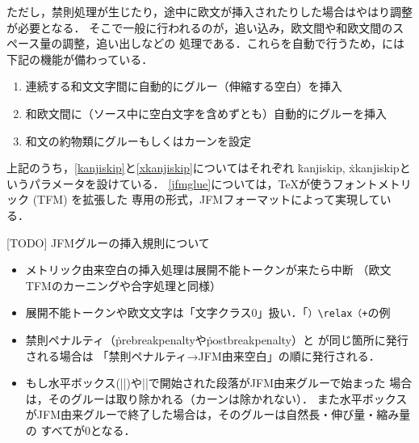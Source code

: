 \documentclass[a4paper,11pt,nomag,dvipdfmx]{jsarticle}
\begin{document}
ただし，禁則処理が生じたり，途中に欧文が挿入されたりした場合はやはり調整が必要となる．
そこで一般に行われるのが，追い込み，欧文間や和欧文間のスペース量の調整，追い出しなどの
処理である．これらを自動で行うため，\pTeX には下記の機能が備わっている．
\begin{enumerate}
\item 連続する和文文字間に自動的にグルー（伸縮する空白）を挿入\label{kanjiskip}
\item 和欧文間に（ソース中に空白文字を含めずとも）自動的にグルーを挿入\label{xkanjiskip}
\item 和文の約物類にグルーもしくはカーンを設定\label{jfmglue}
\end{enumerate}
上記のうち，\ref{kanjiskip}と\ref{xkanjiskip}についてはそれぞれ
\.{kanjiskip}, \.{xkanjiskip}というパラメータを設けている．
\ref{jfmglue}については，\TeX が使うフォントメトリック (TFM) を拡張した
\pTeX 専用の形式，JFMフォーマットによって実現している．

[TODO] JFMグルーの挿入規則について
\begin{itemize}
 \item メトリック由来空白の挿入処理は展開不能トークンが来たら中断
  （欧文TFMのカーニングや合字処理と同様）
 \item 展開不能トークンや欧文文字は「文字クラス0」扱い．「\verb|）\relax（+|の例
 \item 禁則ペナルティ（\.{prebreakpenalty}や\.{postbreakpenalty}）と
  が同じ箇所に発行される場合は
  「禁則ペナルティ→JFM由来空白」の順に発行される．
\iffalse %
 \item より一般に，禁則ペナルティ，JFM由来空白，ベースライン補正，
  欧文TFM由来カーンが同じ箇所に発行される場合は
  次の順になる（\ref{sec:kinsoku}節の注意の一般化）．%
  \begin{itemize}
   \item 和文→欧文：禁則ペナルティ→JFM由来空白→ベースライン補正→%
   欧文TFM由来カーン
   \item 欧文→和文：ベースライン補正→禁則ペナルティ→JFM由来空白
   \footnote{[TODO] \TeX~Live~2019の\pTeX~3.8.2では，欧文TFM由来カーンは欧文→和文の
   切替時には挿入されない．}%
  \end{itemize}
\fi %
 \item もし水平ボックス(|\hbox|)や|\noindent|で開始された段落がJFM由来グルーで始まった
   場合は，そのグルーは取り除かれる（カーンは除かれない）．
   また水平ボックスがJFM由来グルーで終了した場合は，そのグルーは自然長・伸び量・縮み量の
   すべてが0となる．
\end{itemize}
\end{document}
